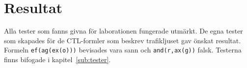 \section{Resultat}
\label{sub:test}

Alla tester som fanns givna för laborationen fungerade utmärkt. De egna tester som skapades för de CTL-formler som beskrev trafikljuset gav önskat resultat. Formeln \texttt{ef(ag(ex(o)))} bevisades vara sann och \texttt{and(r,ax(g))} falsk. Testerna finns bifogade i kapitel~\ref{sub:tester}.